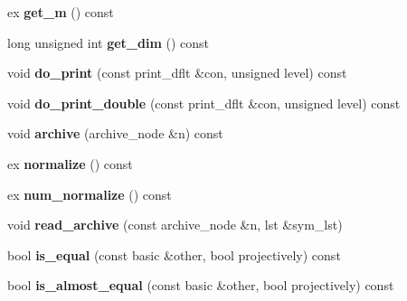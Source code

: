 \begin{DoxyCompactItemize}
ex {\bfseries get\+\_\+m} () const
\item 
\mbox{\label{class_moeb_inv_1_1cycle__data_ae8ac42662e223cd0bcc1c183ad3dc63f}} 
long unsigned int {\bfseries get\+\_\+dim} () const
\item 
\mbox{\label{class_moeb_inv_1_1cycle__data_a9717902ddc67445f59435bb337c28911}} 
void {\bfseries do\+\_\+print} (const print\+\_\+dflt \&con, unsigned level) const
\item 
\mbox{\label{class_moeb_inv_1_1cycle__data_a4363636129953f252188b9e93470f4b2}} 
void {\bfseries do\+\_\+print\+\_\+double} (const print\+\_\+dflt \&con, unsigned level) const
\item 
\mbox{\label{class_moeb_inv_1_1cycle__data_a9dad62da5cb5f025f4fa7b64cbb546a8}} 
void {\bfseries archive} (archive\+\_\+node \&n) const
\item 
\mbox{\label{class_moeb_inv_1_1cycle__data_aa0073f0a4597a6b8f0e1ee3317570542}} 
ex {\bfseries normalize} () const
\item 
\mbox{\label{class_moeb_inv_1_1cycle__data_a7997b5e73a91adf3f9f5b14aaa5a61c6}} 
ex {\bfseries num\+\_\+normalize} () const
\item 
\mbox{\label{class_moeb_inv_1_1cycle__data_a8bef9797e7f925117367e09b2a23744b}} 
void {\bfseries read\+\_\+archive} (const archive\+\_\+node \&n, lst \&sym\+\_\+lst)
\item 
\mbox{\label{class_moeb_inv_1_1cycle__data_a716bef3e02598d655d2081304a6f337c}} 
bool {\bfseries is\+\_\+equal} (const basic \&other, bool projectively) const
\item 
\mbox{\label{class_moeb_inv_1_1cycle__data_adee17e9036599531cbf216c8f2004690}} 
bool {\bfseries is\+\_\+almost\+\_\+equal} (const basic \&other, bool projectively) const
\item 
\mbox{\label{class_moeb_inv_1_1cycle__data_a71333b34417ebeabc593e8262e8e6823}} 

\end{DoxyCompactItemize}
